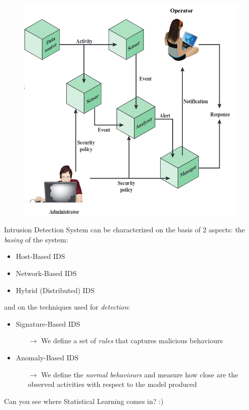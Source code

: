 	\begin{frame}
		\begin{figure}
			\includegraphics[width=\textwidth, height=0.85\textheight,keepaspectratio]{img/IDS.png}
		\end{figure}
	\end{frame}
	
	\begin{frame}
		Intrusion Detection System can be characterized on the basis of 2 aspects: the \emph{basing} of the system:
		\begin{itemize}
			\item Host-Based IDS
			\item Network-Based IDS
			\item Hybrid (Distributed) IDS
		\end{itemize}
		and on the techniques used for \emph{detection}:
		\begin{itemize}
			\item Signature-Based IDS
			\begin{itemize}
				\item[$\rightarrow$] We define a set of \emph{rules} that captures malicious behaviours
			\end{itemize}
			\item Anomaly-Based IDS
			\begin{itemize}
				\item[$\rightarrow$] We define the \emph{normal behaviours} and measure how close are the observed activities with respect to the model produced
			\end{itemize}
		\end{itemize}
		Can you see where Statistical Learning comes in? :)
	\end{frame}
	
